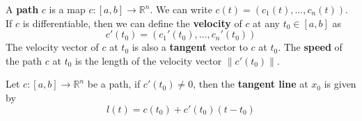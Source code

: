 \documentclass[openany]{book}
\newcommand{\R}{\mathbb{R}}
\begin{document}
 


\begin{defn}[path]
    A \textbf{path} $c$ is a map $c: [a,b]\to \R^n$. We can write $c(t)=(c_1(t), \dots, c_n(t))$. If $c$ is differentiable, then we can define the \textbf{velocity} of $c$ at any $t_0\in [a,b]$ as 
    \begin{equation*}
        c'(t_0)=\left(c_1'(t_0), \dots, c_n'(t_0)\right)
    \end{equation*}
    The velocity vector of $c$ at $t_0$ is also a \textbf{tangent} vector to $c$ at $t_0$. The \textbf{speed} of the path $c$ at $t_0$ is the length of the velocity vector $\|c'(t_0)\|$.
\end{defn}

\begin{defn}
    Let $c:[a,b]\to\R^n$ be a path, if $c'(t_0)\neq 0$, then the \textbf{tangent line} at $x_0$ is given by 
    \begin{equation*}
        l(t)=c(t_0)+c'(t_0)(t-t_0)
    \end{equation*}
\end{defn}
\end{document}
